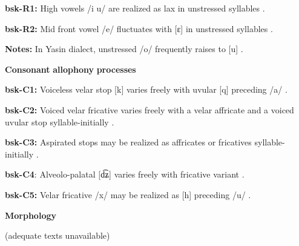 \begin{styleBody}
\textbf{bsk-R1:} High vowels /i u/ are realized as lax in unstressed syllables \citep[1029]{Anderson1997}.
\end{styleBody}

\begin{styleBody}
\textbf{bsk-R2:} Mid front vowel /e/ fluctuates with [ɛ] in unstressed syllables \citep[1029]{Anderson1997}.
\end{styleBody}

\begin{styleBody}
\textbf{Notes:} In Yasin dialect, unstressed /o/ frequently raises to [u] \citep[1038]{Anderson1997}.
\end{styleBody}

\begin{styleBody}
\textbf{Consonant} \textbf{allophony} \textbf{processes}
\end{styleBody}

\begin{styleBody}
\textbf{bsk-C1:} Voiceless velar stop [k] varies freely with uvular [q] preceding /a/ \citep[1025]{Anderson1997}.
\end{styleBody}

\begin{styleBody}
\textbf{bsk-C2:} Voiced velar fricative varies freely with a velar affricate and a voiced uvular stop syllable-initially \citep[1025]{Anderson1997}.
\end{styleBody}

\begin{styleBody}
\textbf{bsk-C3:} Aspirated stops may be realized as affricates or fricatives syllable-initially \citep[1025]{Anderson1997}.
\end{styleBody}

\begin{styleBody}
\textbf{bsk-C4}: Alveolo-palatal [d͡ʑ] varies freely with fricative variant \citep[1025]{Anderson1997}.
\end{styleBody}

\begin{styleBody}
\textbf{bsk-C5:} Velar fricative /x/ may be realized as [h] preceding /u/ \citep[1025]{Anderson1997}.
\end{styleBody}

\begin{styleBody}
\textbf{Morphology}
\end{styleBody}

\begin{styleBody}
(adequate texts unavailable)
\end{styleBody}

